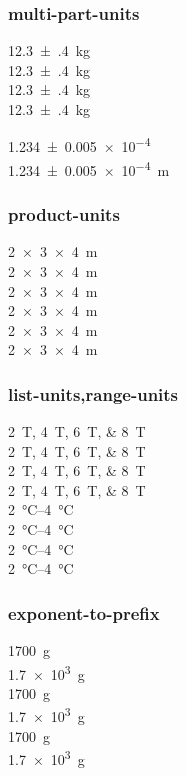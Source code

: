 \documentclass{article}
\begin{document}
\subsubsection{multi-part-units}
{
%
\SI{12.3(4)}{\kilo\gram} \\
\SI[multi-part-units = brackets]{12.3(4)}{\kilo\gram} \\
\SI[multi-part-units = repeat]{12.3(4)}{\kilo\gram}\\
\SI[multi-part-units = single]{12.3(4)}{\kilo\gram}\\
}

{
%
\num{1.234(5)e-4} \\
\SI{1.234(5)e-4}{\metre}\\
}
\subsubsection{product-units}
\SI{2 x 3 x 4}{\metre} \\
\SI[product-units = brackets]{2 x 3 x 4}{\metre}\\
\SI[product-units = brackets-power]{2 x 3 x 4}{\metre}\\
\SI[product-units = power]{2 x 3 x 4}{\metre}\\
\SI[product-units = repeat]{2 x 3 x 4}{\metre}\\
\SI[product-units = single]{2 x 3 x 4}{\metre}\\

\subsubsection{list-units,range-units}
\SIlist{2;4;6;8}{\tesla} \\
\SIlist[list-units = brackets]{2;4;6;8}{\tesla} \\
\SIlist[list-units = repeat]{2;4;6;8}{\tesla} \\
\SIlist[list-units = single]{2;4;6;8}{\tesla} \\
\SIrange{2}{4}{\degreeCelsius} \\
\SIrange[range-units = brackets]{2}{4}{\degreeCelsius} \\
\SIrange[range-units = repeat]{2}{4}{\degreeCelsius} \\
\SIrange[range-units = single]{2}{4}{\degreeCelsius}\\

\subsubsection{exponent-to-prefix}
\SI{1700}{\g} \\
\SI{1.7e3}{\g} \\
{
%
\SI{1700}{\g} \\
\SI{1.7e3}{\g} \\
}
{
%
\SI{1700}{\g} \\
\SI{1.7e3}{\g}\\
}
\end{document}
